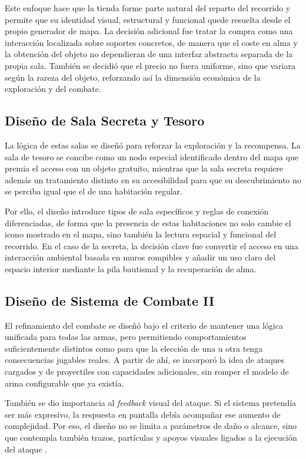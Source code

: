 Este enfoque hace que la tienda forme parte natural del reparto del recorrido y permite que
su identidad visual, estructural y funcional quede resuelta desde el propio generador de
mapa. La decisión adicional fue tratar la compra como una interacción localizada sobre
soportes concretos, de manera que el coste en alma y la obtención del objeto no dependieran
de una interfaz abstracta separada de la propia sala. También se decidió que el precio no
fuera uniforme, sino que variara según la rareza del objeto, reforzando así la dimensión
económica de la exploración y del combate.

\subsection{Diseño de Sala Secreta y Tesoro}
La lógica de estas salas se diseñó para reforzar la exploración y la recompensa. La sala de
tesoro se concibe como un nodo especial identificado dentro del mapa que premia el acceso con
un objeto gratuito, mientras que la sala secreta requiere además un tratamiento distinto en
su accesibilidad para que su descubrimiento no se perciba igual que el de una habitación
regular.

Por ello, el diseño introduce tipos de sala específicos y reglas de conexión diferenciadas,
de forma que la presencia de estas habitaciones no solo cambie el icono mostrado en el mapa,
sino también la lectura espacial y funcional del recorrido. En el caso de la secreta, la
decisión clave fue convertir el acceso en una interacción ambiental basada en muros rompibles
y añadir un uso claro del espacio interior mediante la pila bautismal y la recuperación de
alma.

\subsection{Diseño de Sistema de Combate II}
El refinamiento del combate se diseñó bajo el criterio de mantener una lógica unificada para
todas las armas, pero permitiendo comportamientos suficientemente distintos como para que la
elección de una u otra tenga consecuencias jugables reales. A partir de ahí, se incorporó la
idea de ataques cargados y de proyectiles con capacidades adicionales, sin romper el modelo
de arma configurable que ya existía.

También se dio importancia al \textit{feedback} visual del ataque. Si el sistema pretendía
ser más expresivo, la respuesta en pantalla debía acompañar ese aumento de complejidad. Por
eso, el diseño no se limita a parámetros de daño o alcance, sino que contempla también
trazos, partículas y apoyos visuales ligados a la ejecución del ataque \cite{swink2008gamefeel}.

